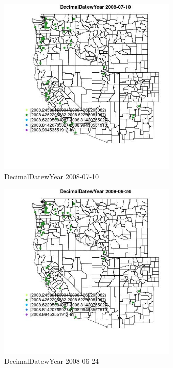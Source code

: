 \begin{figure} 
\centering  
\includegraphics[width=0.77\textwidth]{Code_Outputs/Report_ML_input_PM25_Step4_part_e_de_duplicated_aves_MapObsDecimalDatewYear2008-07-10.jpg} 
\caption{\label{fig:Report_ML_input_PM25_Step4_part_e_de_duplicated_avesMapObsDecimalDatewYear2008-07-10}DecimalDatewYear 2008-07-10} 
\end{figure} 
 

\clearpage 

\begin{figure} 
\centering  
\includegraphics[width=0.77\textwidth]{Code_Outputs/Report_ML_input_PM25_Step4_part_e_de_duplicated_aves_MapObsDecimalDatewYear2008-06-24.jpg} 
\caption{\label{fig:Report_ML_input_PM25_Step4_part_e_de_duplicated_avesMapObsDecimalDatewYear2008-06-24}DecimalDatewYear 2008-06-24} 
\end{figure} 
 

